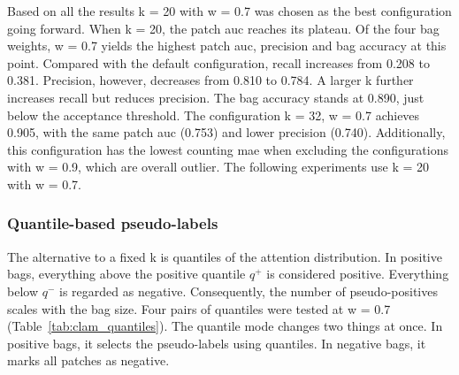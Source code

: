 \documentclass[12pt,parskip = half, DIV=classic,listof=totoc]{scrartcl}
\begin{document}
			Based on all the results k = 20 with w = 0.7 was chosen as the best configuration going forward. When k = 20,
			the patch \ac{auc} reaches its plateau. Of the four bag weights, w = 0.7 yields the
			highest patch \ac{auc}, precision and bag accuracy at this point. Compared with the default configuration,
			recall increases from 0.208 to 0.381. Precision, however, decreases from 0.810 to
			0.784. A larger k further increases recall but reduces precision. The bag accuracy
			stands at 0.890, just below the acceptance threshold. The configuration k = 32,
			w = 0.7 achieves 0.905, with the same patch \ac{auc} (0.753) and lower
			precision (0.740). Additionally, this configuration has 
			the lowest counting \ac{mae} when excluding the configurations with w = 0.9, which are overall outlier.
			The following experiments use k = 20 with w = 0.7. 

			\subsubsection{Quantile-based pseudo-labels}\label{sec:clam_quantiles}
			The alternative to a fixed k is quantiles of the attention distribution. In positive
			bags, everything above the positive quantile $q^+$ is considered positive. Everything below $q^-$ is
			regarded as negative. Consequently, the number of pseudo-positives scales with the bag size. Four pairs
			of quantiles were tested at w = 0.7 (Table~\ref{tab:clam_quantiles}). The quantile mode changes two things at once. In positive bags, it selects the pseudo-labels
			using quantiles. In negative bags, it marks all patches as negative. 
\end{document}
